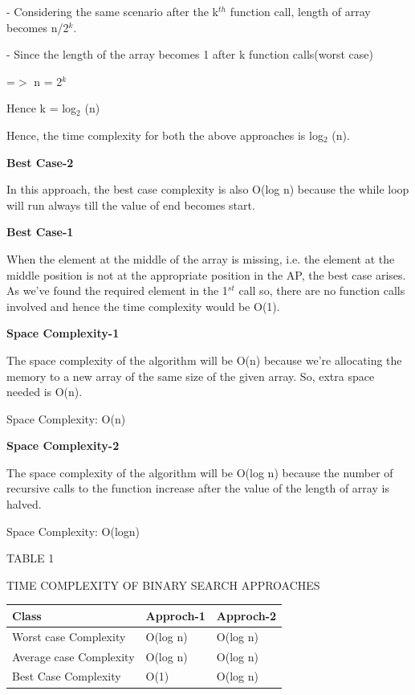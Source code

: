 \documentclass[12pt,a4paper]{article}
\begin{document}
\begin{multicols}{2}
-  Considering the same scenario after the k$^{th}$ function call, length of array becomes n/2$^{k}$.

-  Since the length of the array becomes 1 after k function calls(worst case) 

=$>$ n = 2$^{k}$

Hence k = log$_{2}$ (n)



Hence, the time complexity for both the above approaches is log$_{2}$
(n).

\textbf{Best Case-2 }

In this approach, the best case complexity is also O(log n) because the while loop will run always till the value of end becomes start.


\textbf{Best Case-1 }

When the element at the middle of the array is missing, i.e. the element at the middle position is not at the appropriate position in the AP, the best case arises. As we've found the required element in the 1$^{st}$ call so, there are no function calls involved and hence the time complexity would be O(1).

\textbf{Space Complexity-1 }

The space complexity of the algorithm will be O(n) because we're allocating the memory to a new array of the same size of the given array. So, extra space needed is O(n).

Space Complexity: O(n)

\textbf{Space Complexity-2 }

The space complexity of the algorithm will be O(log n) because the number of recursive calls to the function increase after the value of the length of array is halved.

Space Complexity: O(logn)





\end{multicols}
\begin{center}TABLE 1\end{center}

\begin{center}TIME COMPLEXITY OF  BINARY SEARCH APPROACHES \end{center}

\begin{table}[h]
\centering
\begin{tabular}{|l|l|l|}
\hline
\textbf{Class} & \textbf{Approch-1} & \textbf{Approch-2} \\
\hline
Worst case Complexity & O(log n) & O(log n) \\
\hline
Average case Complexity & O(log n) & O(log n) \\
\hline
Best Case Complexity & O(1) & O(log n) \\
\hline
\end{tabular}
\end{table}
\end{document}
